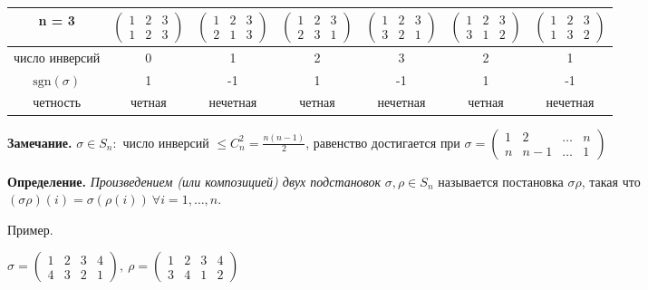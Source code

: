 \begin{table}[!ht]
		\begin{tabular}{c|c|c|c|c|c|c}
    	n = 3 & $\begin{pmatrix} 1 & 2 & 3 \\ 1 & 2 & 3 \end{pmatrix}$ & $\begin{pmatrix} 1 & 2 & 3 \\ 2 & 1 & 3 \end{pmatrix}$ & $\begin{pmatrix} 1 & 2 & 3 \\ 2 & 3 & 1 \end{pmatrix}$ & $\begin{pmatrix} 1 & 2 & 3 \\ 3 & 2 & 1 \end{pmatrix}$ & $\begin{pmatrix} 1 & 2 & 3 \\ 3 & 1 & 2 \end{pmatrix}$ & $\begin{pmatrix} 1 & 2 & 3 \\ 1 & 3 & 2 \end{pmatrix}$ \\
        \hline
       число инверсий & 0 & 1 & 2 & 3 & 2 & 1\\
       \hline
          $\mathrm{sgn} (\sigma)$ & 1 & -1 & 1 & -1 & 1 & -1 \\
          \hline
        четность & четная & нечетная & четная & нечетная & четная & нечетная
		\end{tabular}
\end{table}

\textbf{Замечание.} $\sigma \in S_n :$ число инверсий $\leq C_n^2 = \frac{n(n-1)}{2}$, равенство достигается при $\sigma = \begin{pmatrix} 1 & 2 & \dots & n \\ n & n-1 & \dots & 1 \end{pmatrix}$

\vspace{\baselineskip}
\textbf{Определение.} \textit{Произведением (или композицией) двух подстановок} $\sigma, \rho \in S_n$ называется постановка $\sigma \rho$, такая что $(\sigma \rho)(i) = \sigma (\rho (i)) \ \forall i=1, \dots, n$.

\vspace{\baselineskip}
Пример.

$\sigma = \begin{pmatrix} 1 & 2 & 3 & 4 \\ 4 & 3 & 2 & 1 \end{pmatrix},\ \rho = \begin{pmatrix} 1 & 2 & 3 & 4 \\ 3 & 4 & 1 & 2 \end{pmatrix}$

